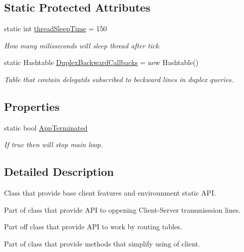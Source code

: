 \subsection*{Static Protected Attributes}
\begin{DoxyCompactItemize}
\item 
static int \mbox{\hyperlink{class_uniform_client_1_1_base_client_a2c4762c1be5eac42b8b5d189530d0952}{thread\+Sleep\+Time}} = 150
\begin{DoxyCompactList}\small\item\em How many milisseconds will sleep thread after tick. \end{DoxyCompactList}\item 
static Hashtable \mbox{\hyperlink{class_uniform_client_1_1_base_client_a52dacc1af85cbab035a159e64e1417a0}{Duplex\+Backward\+Callbacks}} = new Hashtable()
\begin{DoxyCompactList}\small\item\em Table that contain delegatds subscribed to beckward lines in duplex queries. \end{DoxyCompactList}\end{DoxyCompactItemize}
\subsection*{Properties}
\begin{DoxyCompactItemize}
\item 
static bool \mbox{\hyperlink{class_uniform_client_1_1_base_client_a10f1c9dbb8d41719754b39344432497f}{App\+Terminated}}
\begin{DoxyCompactList}\small\item\em If true then will stop main loop. \end{DoxyCompactList}\end{DoxyCompactItemize}


\subsection{Detailed Description}
Class that provide base client features and envirounment static A\+PI. 

Part of class that provide A\+PI to oppening Client-\/\+Server transmisssion lines. 

Part off class that provide A\+PI to work by routing tables. 

Part of class that provide methods that simplify using of client. 


